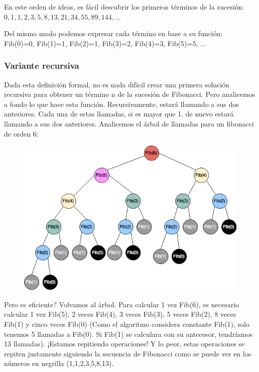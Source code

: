 En este orden de ideas, es fácil descubrir los primeros términos de la sucesión:\\ $0,1,1,2,3,5,8,13,21,34,55,89,144, \dots$ 

Del mismo modo podemos expresar cada término en base a su función:\\ Fib(0)=0, Fib(1)=1, Fib(2)=1, Fib(3)=2, Fib(4)=3, Fib(5)=5, $\dots$

\subsubsection*{Variante recursiva}

Dada esta definición formal, no es nada difícil crear una primera solución recursiva para obtener un término n de la sucesión de Fibonacci. Pero analicemos a fondo lo que hace esta función. Recursivamente, estará llamando a sus dos anteriores. Cada una de estas llamadas, si es mayor que 1, de nuevo estará llamando a sus dos anteriores. Analicemos el árbol de llamadas para un fibonacci de orden 6:

\begin{figure}[!h]
	\centering
	\includegraphics[scale=0.50]{img/arbol-fibonacci.png}
	\label{fig:generalizacion-fibonacci-2}
\end{figure}

Pero es eficiente? Volvamos al árbol. Para calcular 1 vez Fib(6), es necesario calcular 1 vez Fib(5), 2 veces Fib(4), 3 veces Fib(3), 5 veces Fib(2), 8 veces Fib(1) y cinco veces Fib(0) (Como el algoritmo considera constante Fib(1), solo tenemos 5 llamadas a Fib(0). Si Fib(1) se calculara con su antecesor, tendríamos 13 llamadas). ¡Estamos repitiendo operaciones! Y lo peor, estas operaciones se repiten justamente siguiendo la secuencia de Fibonacci como se puede ver en los números en negrilla (1,1,2,3,5,8,13).


